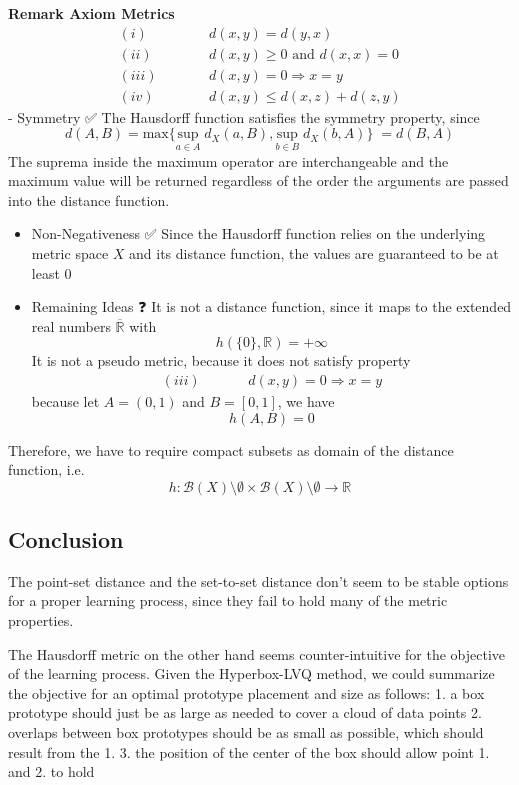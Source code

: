 \documentclass[
]{article}
\begin{document}
\textbf{Remark Axiom Metrics} \[\begin{alignat}{2}
(i)& \quad&&d(x,y) = d(y,x) \tag{Symmetry} \\
(ii)& \;\quad&&d(x,y) \geq 0 \text{ and } d(x,x)=0 \tag{Non-Negativeness} \\
(iii)& \quad &&d(x,y)=0 \Rightarrow x=y \tag{Positiveness} \\ 
(iv)& \quad &&d(x,y) \leq d(x,z) + d(z,y) \tag{Triangle Inequality}
\end{alignat}\] - Symmetry ✅ The Hausdorff function satisfies the
symmetry property, since
\[d(A,B) = \underset{}{\text{max}}\{ \underset{a \in A}{\text{sup}} \; d_{X}(a,B), \underset{b \in B}{\text{sup}} \; d_{X}(b, A)\}\; = d(B,A)\]
The suprema inside the maximum operator are interchangeable and the
maximum value will be returned regardless of the order the arguments are
passed into the distance function.

\begin{itemize}
\item
  Non-Negativeness ✅ Since the Hausdorff function relies on the
  underlying metric space \(X\) and its distance function, the values
  are guaranteed to be at least 0
\item
  Remaining Ideas ❓ It is not a distance function, since it maps to the
  extended real numbers \(\overline{\mathbb{R}}\) with
  \[h(\{ 0 \}, \mathbb{R}) = + \infty\] It is not a pseudo metric,
  because it does not satisfy property \[\begin{alignat}{2}
   (iii)& \quad &&d(x,y)=0 \Longrightarrow x=y \tag{positiveness}
  \end{alignat}\] because let \(A=(0,1)\) and \(B=[0,1]\), we have
  \[h(A,B)=0\]
\end{itemize}

Therefore, we have to require compact subsets as domain of the distance
function, i.e.~
\[h: \mathcal{B}(X)\setminus \emptyset \times \mathcal{B}(X)\setminus \emptyset \to \mathbb{R}\]

\hypertarget{conclusion}{%
\subsection{Conclusion}\label{conclusion}}

The point-set distance and the set-to-set distance don't seem to be
stable options for a proper learning process, since they fail to hold
many of the metric properties.

The Hausdorff metric on the other hand seems counter-intuitive for the
objective of the learning process. Given the Hyperbox-LVQ method, we
could summarize the objective for an optimal prototype placement and
size as follows: 1. a box prototype should just be as large as needed to
cover a cloud of data points 2. overlaps between box prototypes should
be as small as possible, which should result from the 1. 3. the position
of the center of the box should allow point 1. and 2. to hold
\end{document}
